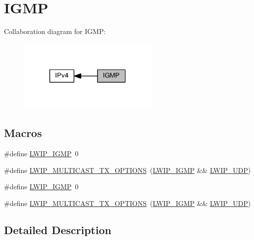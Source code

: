 \hypertarget{group__lwip__opts__igmp}{}\section{I\+G\+MP}
\label{group__lwip__opts__igmp}
Collaboration diagram for I\+G\+MP\+:
\nopagebreak
\begin{figure}[H]
\begin{center}
\leavevmode
\includegraphics[width=195pt]{group__lwip__opts__igmp}
\end{center}
\end{figure}
\subsection*{Macros}
\begin{DoxyCompactItemize}
\item 
\#define \hyperlink{group__lwip__opts__igmp_gadaf25915ae1fd69c0943ef68cbb38923}{L\+W\+I\+P\+\_\+\+I\+G\+MP}~0
\item 
\#define \hyperlink{group__lwip__opts__igmp_gab8d7d53247cc62caa76f54b2c5a5df30}{L\+W\+I\+P\+\_\+\+M\+U\+L\+T\+I\+C\+A\+S\+T\+\_\+\+T\+X\+\_\+\+O\+P\+T\+I\+O\+NS}~(\hyperlink{openmote-cc2538_2lwip_2test_2unit_2lwipopts_8h_adaf25915ae1fd69c0943ef68cbb38923}{L\+W\+I\+P\+\_\+\+I\+G\+MP} \&\& \hyperlink{group__lwip__opts__udp_gab6030e96e72df649d2650fd32d7a67b3}{L\+W\+I\+P\+\_\+\+U\+DP})
\item 
\#define \hyperlink{group__lwip__opts__igmp_gadaf25915ae1fd69c0943ef68cbb38923}{L\+W\+I\+P\+\_\+\+I\+G\+MP}~0
\item 
\#define \hyperlink{group__lwip__opts__igmp_gab8d7d53247cc62caa76f54b2c5a5df30}{L\+W\+I\+P\+\_\+\+M\+U\+L\+T\+I\+C\+A\+S\+T\+\_\+\+T\+X\+\_\+\+O\+P\+T\+I\+O\+NS}~(\hyperlink{openmote-cc2538_2lwip_2test_2unit_2lwipopts_8h_adaf25915ae1fd69c0943ef68cbb38923}{L\+W\+I\+P\+\_\+\+I\+G\+MP} \&\& \hyperlink{group__lwip__opts__udp_gab6030e96e72df649d2650fd32d7a67b3}{L\+W\+I\+P\+\_\+\+U\+DP})
\end{DoxyCompactItemize}


\subsection{Detailed Description}


